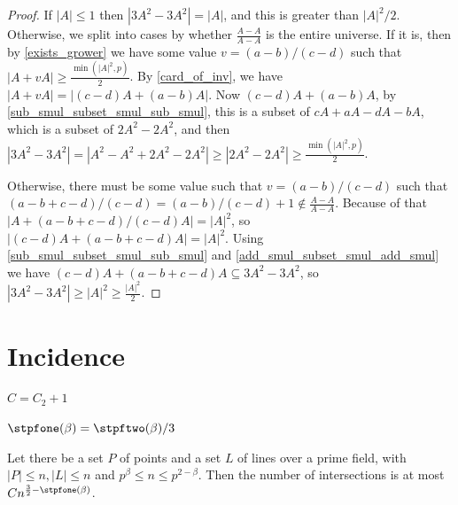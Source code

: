 \begin{proof}
    \leanok
    If $|A| \leq 1$ then $|3 A^2 - 3 A^2| = |A|$, and this is greater than $|A|^2 / 2$.
    Otherwise, we split into cases by whether $\frac{A - A}{A - A}$ is the entire universe.
    If it is, then by \ref{exists_grower} we have some value $v = (a-b)/(c-d)$ such that
    $|A + vA| \geq \frac{\min(|A|^2, p)}2$. By \ref{card_of_inv}, we have $|A + vA| = |(c-d) A + (a-b) A|$.
    Now $(c-d) A + (a-b) A$, by \ref{sub_smul_subset_smul_sub_smul}, this is a subset of 
    $c A + a A - d A - b A$, which is a subset of $2 A^2 - 2 A^2$, and then
    $|3A^2 - 3A^2| = |A^2 - A^2 + 2 A^2 - 2 A^2| \geq |2 A^2 - 2 A^2| \geq \frac{\min(|A|^2, p)}2$.

    Otherwise, there must be some value such that $v = (a-b)/(c-d)$ such that
    $(a-b+c-d)/(c-d) = (a-b)/(c-d)+1 \notin \frac{A - A}{A - A}$.
    Because of that $|A + (a-b+c-d)/(c-d) A| = |A|^2$, so
    $|(c-d) A + (a-b+c-d) A| = |A|^2$. 
    Using \ref{sub_smul_subset_smul_sub_smul} and \ref{add_smul_subset_smul_add_smul} we have
    $(c-d) A + (a-b+c-d) A \subseteq 3A^2 - 3A^2$, so $|3A^2 - 3A^2| \geq |A|^2 \geq \frac{|A|^2}2$.
\end{proof}

\chapter{Incidence}
\label{chap:inc}

\begin{definition}
    \label{ST_C}
    \leanok
    $C = C_2 + 1$
\end{definition}

\begin{definition}
    \label{ST_prime_field_eps}
    \leanok
    $\stpfone(\beta) = \stpftwo(\beta) / 3$
\end{definition}

\begin{theorem}
    \label{ST_prime_field}
    \leanok
    Let there be a set $P$ of points and a set $L$ of lines over a prime field, 
    with $|P| \leq n, |L| \leq n$ and $p^\beta \leq n \leq p^{2 - \beta}$.
    Then the number of intersections is at most $ C n^{\frac32 - \stpfone(\beta)} $.
\end{theorem}

